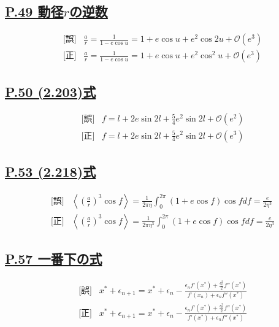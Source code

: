 \documentclass[9pt,fleqn]{bxjsarticle}
\begin{document}
\subsection*{\underline{P.49 動径$r$の逆数}}
\begin{align*}
    &\text{[誤]} \hspace{10pt} \frac{a}{r} = \frac{1}{1-e\cos{u}} = 1 + e\cos{u} + e^2\cos{2u} + \mathcal{O}(e^3) \\
    &\text{[正]} \hspace{10pt} \frac{a}{r} = \frac{1}{1-e\cos{u}} = 1 + e\cos{u} + e^2\cos^2{u} + \mathcal{O}(e^3)
\end{align*}

\subsection*{\underline{P.50 (2.203)式}}
\begin{align*}
    &\text{[誤]} \hspace{10pt} f = l + 2e\sin{2l} + \frac{5}{4}e^2\sin{2l} + \mathcal{O}(e^2) \\
    &\text{[正]} \hspace{10pt} f = l + 2e\sin{2l} + \frac{5}{4}e^2\sin{2l} + \mathcal{O}(e^3) 
\end{align*}

\subsection*{\underline{P.53 (2.218)式}}
\begin{align*}
    &\text{[誤]} \hspace{10pt} \left\langle\left(\frac{a}{r}\right)^3\cos{f}\right\rangle = \frac{1}{2\pi\eta}\int_{0}^{2\pi}(1+e\cos{f})\cos{f}df = \frac{e}{2\eta^3} \\
    &\text{[正]} \hspace{10pt} \left\langle\left(\frac{a}{r}\right)^3\cos{f}\right\rangle = \frac{1}{2\pi\eta^3}\int_{0}^{2\pi}(1+e\cos{f})\cos{f}df = \frac{e}{2\eta^3}  
\end{align*}

\subsection*{\underline{P.57 一番下の式}}
\begin{align*}
    &\text{[誤]} \hspace{10pt} x^*+\epsilon_{n+1} = x^* + \epsilon_n - \frac{\epsilon_nf'(x^*)+\frac{\epsilon_n^2}{2}f''(x^*)}{f'(x_n)+\epsilon_nf''(x^*)}  \\
    &\text{[正]} \hspace{10pt} x^*+\epsilon_{n+1} = x^* + \epsilon_n - \frac{\epsilon_nf'(x^*)+\frac{\epsilon_n^2}{2}f''(x^*)}{f'(x^*)+\epsilon_nf''(x^*)} 
\end{align*}
\end{document}
